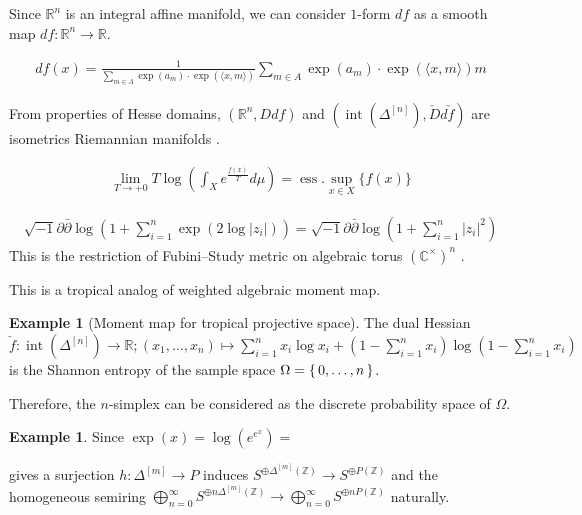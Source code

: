 \documentclass[a4paper,dvipdfmx,reqno,12pt]{amsart}
\theoremstyle{definition}
\newtheorem{Eg}[Thm]{Example}
\newcommand{\C}{\mathbb{C}}%
\newcommand{\R}{\mathbb{R}}%
\newcommand{\Z}{\mathbb{Z}}%
\newcommand{\opn}[1]{\operatorname{#1}}
\newcommand{\abk}[1]{\langle {#1} \rangle}%
\newcommand{\Paren}[1]{\left ( {#1} \right )}%
\numberwithin{equation}{section}
\begin{document}
Since $\R^{n}$ is an integral affine manifold, we can consider $1$-form $df$ as a smooth map
$df: \R^{n}\to \R$.

\begin{align}
  df(x)= \frac{1}{\sum_{m\in A} \opn{exp}(a_m)\cdot\opn{exp}(\abk{x,m})}
  \sum_{m\in A} \opn{exp}(a_m)\cdot\opn{exp}(\abk{x,m})m
\end{align}



From properties of Hesse domains, $(\R^{n},Ddf)$ and
$(\opn{int}(\Delta^{[n]}),\check{D}d\check{f})$ are isometrics
Riemannian manifolds \cite[Proposition 2.3.3]{}.




\begin{align}
  \lim_{T\to +0} T \log \Paren{\int_X e^{\frac{f(x)}{T}}d\mu}=
  \opn{ess}\!.\!\sup_{x\in X}\{f(x)\}
\end{align}

\begin{align}
  \sqrt{-1} \partial \bar{\partial}
  \log(1+\sum_{i=1}^{n}\opn{exp}(2\log |z_i|))
  =\sqrt{-1} \partial \bar{\partial}\log(1+\sum_{i=1}^{n}|z_i|^{2})
\end{align}
This is the restriction of Fubini--Study metric on algebraic torus
$(\C^{\times})^{n}$ \cite[Examples 3.1.9 i)]{MR2093043}.


This is a tropical analog of weighted algebraic moment map.



\begin{Eg}[Moment map for tropical projective space]
  The dual Hessian
  $\check{f}:\opn{int}(\Delta^{[n]})\to \R;
    (x_1,\ldots,x_n)\mapsto
    \sum_{i=1}^{n}x_i\log x_i+(1-\sum_{i=1}^{n}x_i )\log (1-\sum_{i=1}^{n}x_i )$
  is the Shannon entropy of the sample space $\Omega=\set{0,\ldots,n}$.



  Therefore, the $n$-simplex can be considered as the discrete probability space of
  $\Omega$.

\end{Eg}

\begin{Eg}
  Since $\opn{exp}(x)=\opn{log}(e^{e^{x}})=$
\end{Eg}

gives a surjection $h:\Delta^{[m]}\to P$ induces
$S^{\oplus\Delta^{[m]}(\Z)}\to S^{\oplus P(\Z)}$ and the homogeneous
semiring
$\bigoplus_{n=0}^{\infty} S^{\oplus n\Delta^{[m]}(\Z)}
  \to \bigoplus_{n=0}^{\infty} S^{\oplus nP(\Z)}$ naturally.
\end{document}
